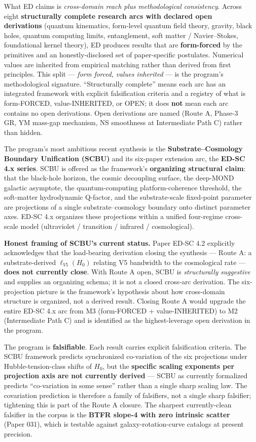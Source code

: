 \documentclass[11pt,a4paper]{article}
\begin{document}
What ED claims is \emph{cross-domain reach plus methodological consistency}. Across eight \textbf{structurally complete research arcs with declared open derivations} (quantum kinematics, form-level quantum field theory, gravity, black holes, quantum computing limits, entanglement, soft matter / Navier--Stokes, foundational kernel theory), ED produces results that are \textbf{form-forced} by the primitives and an honestly-disclosed set of paper-specific postulates. Numerical values are inherited from empirical matching rather than derived from first principles. This split --- \emph{form forced, values inherited} --- is the program's methodological signature. ``Structurally complete'' means each arc has an integrated framework with explicit falsification criteria and a registry of what is form-FORCED, value-INHERITED, or OPEN; it does \textbf{not} mean each arc contains no open derivations. Open derivations are named (Route A, Phase-3 GR, YM mass-gap mechanism, NS smoothness at Intermediate Path C) rather than hidden.

The program's most ambitious recent synthesis is the \textbf{Substrate--Cosmology Boundary Unification (SCBU)} and its six-paper extension arc, the \textbf{ED-SC 4.x series}. SCBU is offered as the framework's \textbf{organizing structural claim}: that the black-hole horizon, the cosmic decoupling surface, the deep-MOND galactic asymptote, the quantum-computing platform-coherence threshold, the soft-matter hydrodynamic Q-factor, and the substrate-scale fixed-point parameter are projections of a single substrate--cosmology boundary onto distinct parameter axes. ED-SC 4.x organizes these projections within a unified four-regime cross-scale model (ultraviolet / transition / infrared / cosmological).

\textbf{Honest framing of SCBU's current status.} Paper ED-SC 4.2 explicitly acknowledges that the load-bearing derivation closing the synthesis --- Route A: a substrate-derived $\ell_{V5}(H_0)$ relating V5 bandwidth to the cosmological rate --- \textbf{does not currently close}. With Route A open, SCBU is \emph{structurally suggestive} and supplies an organizing schema; it is not a closed cross-arc derivation. The six-projection picture is the framework's hypothesis about how cross-domain structure is organized, not a derived result. Closing Route A would upgrade the entire ED-SC 4.x arc from M3 (form-FORCED + value-INHERITED) to M2 (Intermediate Path C) and is identified as the highest-leverage open derivation in the program.

The program is \textbf{falsifiable}. Each result carries explicit falsification criteria. The SCBU framework predicts synchronized co-variation of the six projections under Hubble-tension-class shifts of $H_0$, but the \textbf{specific scaling exponents per projection axis are not currently derived} --- SCBU as currently formalized predicts ``co-variation in some sense'' rather than a single sharp scaling law. The covariation prediction is therefore a family of falsifiers, not a single sharp falsifier; tightening this is part of the Route A closure. The sharpest currently-clean falsifier in the corpus is the \textbf{BTFR slope-4 with zero intrinsic scatter} (Paper 031), which is testable against galaxy-rotation-curve catalogs at present precision.
\end{document}
